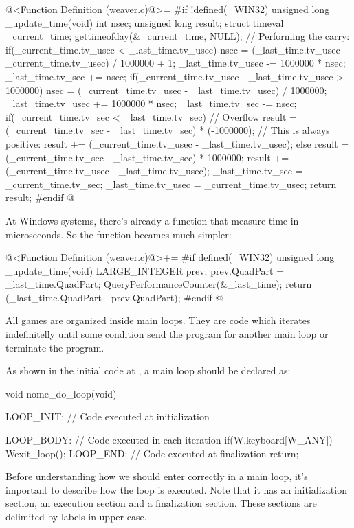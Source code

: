 \iniciocodigo
@<Function Definition (weaver.c)@>=
#if !defined(_WIN32)
unsigned long _update_time(void){
  int nsec;
  unsigned long result;
  struct timeval _current_time;
  gettimeofday(&_current_time, NULL);
  // Performing the carry:
  if(_current_time.tv_usec < _last_time.tv_usec){
    nsec = (_last_time.tv_usec - _current_time.tv_usec) / 1000000 + 1;
    _last_time.tv_usec -= 1000000 * nsec;
    _last_time.tv_sec += nsec;
  }
  if(_current_time.tv_usec - _last_time.tv_usec > 1000000){
    nsec = (_current_time.tv_usec - _last_time.tv_usec) / 1000000;
    _last_time.tv_usec += 1000000 * nsec;
    _last_time.tv_sec -= nsec;
  }
  if(_current_time.tv_sec < _last_time.tv_sec){
    // Overflow
    result = (_current_time.tv_sec - _last_time.tv_sec) * (-1000000);
    // This is always positive:
    result += (_current_time.tv_usec - _last_time.tv_usec);
  }
  else{
    result = (_current_time.tv_sec - _last_time.tv_sec) * 1000000;
    result += (_current_time.tv_usec - _last_time.tv_usec);
  }
  _last_time.tv_sec = _current_time.tv_sec;
  _last_time.tv_usec = _current_time.tv_usec;
  return result;
}
#endif
@
\fimcodigo

At Windows systems, there's already a function that measure time in
microseconds. So the function becames much simpler:

\iniciocodigo
@<Function Definition (weaver.c)@>+=
#if defined(_WIN32)
unsigned long _update_time(void){
  LARGE_INTEGER prev;
  prev.QuadPart = _last_time.QuadPart;
  QueryPerformanceCounter(&_last_time);
  return (_last_time.QuadPart - prev.QuadPart);
}
#endif
@
\fimcodigo


All games are organized inside main loops. They are code which
iterates indefinitelly until some condition send the program for
another main loop or terminate the program.

As shown in the initial code at , a main loop
should be declared as:

\alinhaverbatim
void nome\_do\_loop(void){
 LOOP\_INIT: // Code executed at initialization

 LOOP\_BODY: // Code executed in each iteration
    if(W.keyboard[W\_ANY])
        Wexit\_loop();
 LOOP\_END: // Code executed at finalization
    return;
}
\alinhanormal

Before understanding how we should enter correctly in a main loop,
it's important to describe how the loop is executed. Note that it has
an initialization section, an execution section and a finalization
section. These sections are delimited by labels in upper case.

